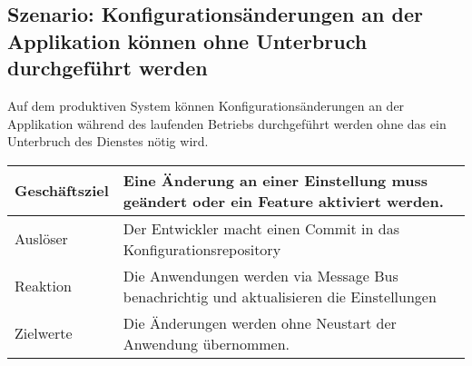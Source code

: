 \subsection{Szenario: Konfigurationsänderungen an der Applikation können ohne Unterbruch durchgeführt werden}

Auf dem produktiven System können Konfigurationsänderungen an der Applikation während des laufenden Betriebs durchgeführt werden ohne das ein Unterbruch des Dienstes nötig wird.

\begin{table}[H]
	\centering
	\begin{tabular}{ | p{3cm} | p{12cm} | }
		\toprule
		Geschäftsziel & Eine Änderung an einer Einstellung muss geändert oder ein Feature aktiviert werden. \\ \hline
		Auslöser & Der Entwickler macht einen Commit in das Konfigurationsrepository\\ \hline
		Reaktion & Die Anwendungen werden via Message Bus benachrichtig und aktualisieren die Einstellungen \\ \hline
		Zielwerte & Die Änderungen werden ohne Neustart der Anwendung übernommen.\\
		\bottomrule
	\end{tabular}
\end{table}
